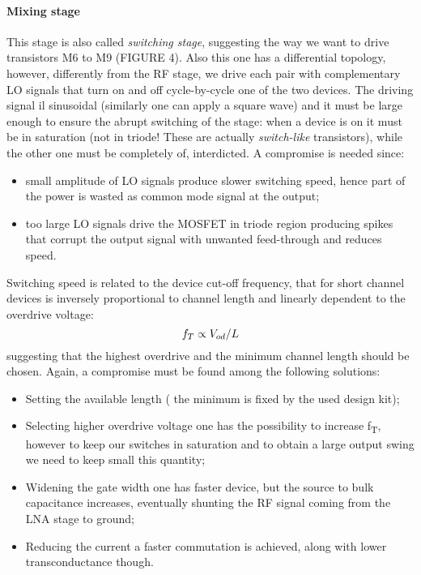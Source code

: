 \paragraph{Mixing stage}
This stage is also called \emph{switching stage}, suggesting the way we want to drive transistors M6 to M9 (FIGURE 4). Also this one has a differential topology, however, differently from the RF stage, we drive each pair with complementary LO signals that turn on and off cycle-by-cycle one of the two devices. The driving signal il sinusoidal (similarly one can apply a square wave) and it must be large enough to ensure the abrupt switching of the stage: when a device is on it must be in saturation (not in  triode! These are actually \emph{switch-like} transistors), while the other one must be completely of, interdicted.
A compromise is needed since:
\begin{itemize}
	\item small amplitude of LO signals produce slower switching speed, hence part of the power is wasted as common mode signal at the output;
	\item too large LO signals drive the MOSFET in triode region producing spikes that corrupt the output signal with unwanted feed-through  and reduces speed.
\end{itemize}
Switching speed is related to the device cut-off frequency, that for short channel devices is inversely proportional to channel length and linearly dependent to the overdrive voltage:
\begin{equation}
f_T \propto  V_{od}/L \notag
\end{equation}
suggesting that the highest overdrive and the minimum channel length should be chosen. Again, a compromise must be found among the following solutions:
\begin{itemize}
	\item Setting the available length ( the minimum is fixed by the used design kit);
	\item Selecting higher overdrive voltage one has the possibility to increase f\textsubscript{T}, however to keep our switches in saturation and to obtain a large output swing we need to keep small this quantity;
	\item Widening the gate width one has faster device, but the source to bulk capacitance increases, eventually shunting the RF signal coming from the LNA stage to ground;
	\item Reducing the current a faster commutation is achieved, along with lower transconductance though.
\end{itemize}

